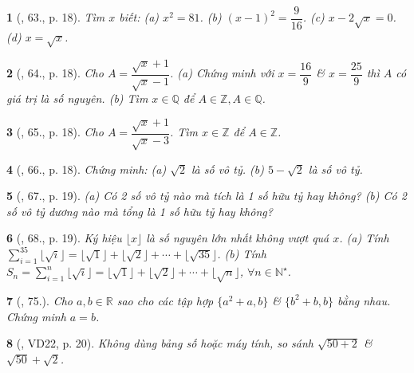 \documentclass{article}
\newtheorem{baitoan}{}
\begin{document}
\begin{baitoan}[\cite{Binh_Toan_7_tap_1}, 63., p. 18]
	Tìm $x$ biết: (a) $x^2 = 81$. (b) $(x - 1)^2 = \dfrac{9}{16}$. (c) $x - 2\sqrt{x} = 0$. (d) $x = \sqrt{x}$.	
\end{baitoan}

\begin{baitoan}[\cite{Binh_Toan_7_tap_1}, 64., p. 18]
	Cho $A = \dfrac{\sqrt{x} + 1}{\sqrt{x} - 1}$. (a) Chứng minh với $x = \dfrac{16}{9}$ \& $x = \dfrac{25}{9}$ thì $A$ có giá trị là số nguyên. (b) Tìm $x\in\mathbb{Q}$ để $A\in\mathbb{Z},A\in\mathbb{Q}$.
\end{baitoan}

\begin{baitoan}[\cite{Binh_Toan_7_tap_1}, 65., p. 18]
	Cho $A = \dfrac{\sqrt{x} + 1}{\sqrt{x} - 3}$. Tìm $x\in\mathbb{Z}$ để $A\in\mathbb{Z}$.
\end{baitoan}

\begin{baitoan}[\cite{Binh_Toan_7_tap_1}, 66., p. 18]
	Chứng minh: (a) $\sqrt{2}$ là số vô tỷ. (b) $5 - \sqrt{2}$ là số vô tỷ.	
\end{baitoan}

\begin{baitoan}[\cite{Binh_Toan_7_tap_1}, 67., p. 19]
	(a) Có 2 số vô tỷ nào mà tích là 1 số hữu tỷ hay không? (b) Có 2 số vô tỷ dương nào mà tổng là 1 số hữu tỷ hay không?	
\end{baitoan}

\begin{baitoan}[\cite{Binh_Toan_7_tap_1}, 68., p. 19]
	Ký hiệu $\lfloor x\rfloor$ là số nguyên lớn nhất không vượt quá $x$. (a) Tính $\sum_{i=1}^{35} \lfloor\sqrt{i}\rfloor = \lfloor\sqrt{1}\rfloor + \lfloor\sqrt{2}\rfloor + \cdots + \lfloor\sqrt{35}\rfloor$. (b) Tính $S_n = \sum_{i=1}^n \lfloor\sqrt{i}\rfloor = \lfloor\sqrt{1}\rfloor + \lfloor\sqrt{2}\rfloor + \cdots + \lfloor\sqrt{n}\rfloor$, $\forall n\in\mathbb{N}^\star$.
\end{baitoan}

\begin{baitoan}[\cite{Binh_Toan_7_tap_1}, 75.]
	Cho $a,b\in\mathbb{R}$ sao cho các tập hợp $\{a^2 + a,b\}$ \& $\{b^2 + b,b\}$ bằng nhau. Chứng minh $a = b$.
\end{baitoan}

\begin{baitoan}[\cite{Tuyen_Toan_7}, VD22, p. 20]
	Không dùng bảng số hoặc máy tính, so sánh $\sqrt{50 + 2}$ \& $\sqrt{50} + \sqrt{2}$.
\end{baitoan}
\end{document}
